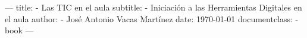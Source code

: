 ---
title:
  - Las TIC en el aula
subtitle:
  - Iniciación a las Herramientas Digitales en el aula
author:
   - José Antonio Vacas Martínez
date: \today
documentclass:
   - book
---
\graphicspath{ {images/} }


\dominitoc

\maketitle

\tableofcontents

\mainmatter
